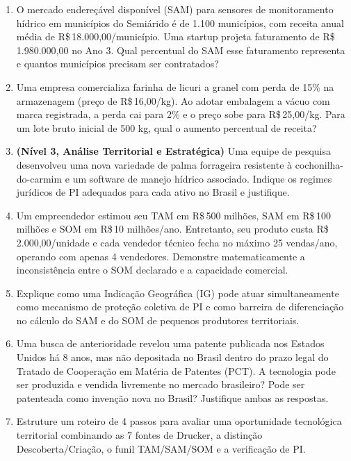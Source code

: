 \begin{enumerate}[leftmargin=1.5em, itemsep=6pt]
  \item O mercado endereçável disponível (SAM) para sensores de monitoramento hídrico em municípios do Semiárido é de 1.100 municípios, com receita anual média de R\$\,18.000,00/município. Uma startup projeta faturamento de R\$\,1.980.000,00 no Ano 3. Qual percentual do SAM esse faturamento representa e quantos municípios precisam ser contratados?
  \espacoResolucao[2.2cm]

  \item Uma empresa comercializa farinha de licuri a granel com perda de 15\% na armazenagem (preço de R\$\,16,00/kg). Ao adotar embalagem a vácuo com marca registrada, a perda cai para 2\% e o preço sobe para R\$\,25,00/kg. Para um lote bruto inicial de 500 kg, qual o aumento percentual de receita?
  \espacoResolucao[2.3cm]

  \item \textbf{(Nível 3, Análise Territorial e Estratégica)} Uma equipe de pesquisa desenvolveu uma nova variedade de palma forrageira resistente à cochonilha-do-carmim e um software de manejo hídrico associado. Indique os regimes jurídicos de PI adequados para cada ativo no Brasil e justifique.
  \espacoResolucao[2.2cm]

  \item Um empreendedor estimou seu TAM em R\$\,500 milhões, SAM em R\$\,100 milhões e SOM em R\$\,10 milhões/ano. Entretanto, seu produto custa R\$\,2.000,00/unidade e cada vendedor técnico fecha no máximo 25 vendas/ano, operando com apenas 4 vendedores. Demonstre matematicamente a inconsistência entre o SOM declarado e a capacidade comercial.
  \espacoResolucao[2.4cm]

  \item Explique como uma Indicação Geográfica (IG) pode atuar simultaneamente como mecanismo de proteção coletiva de PI e como barreira de diferenciação no cálculo do SAM e do SOM de pequenos produtores territoriais.
  \espacoResolucao[2.2cm]

  \item Uma busca de anterioridade revelou uma patente publicada nos Estados Unidos há 8 anos, mas não depositada no Brasil dentro do prazo legal do Tratado de Cooperação em Matéria de Patentes (PCT). A tecnologia pode ser produzida e vendida livremente no mercado brasileiro? Pode ser patenteada como invenção nova no Brasil? Justifique ambas as respostas.
  \espacoResolucao[2.4cm]

  \item Estruture um roteiro de 4 passos para avaliar uma oportunidade tecnológica territorial combinando as 7 fontes de Drucker, a distinção Descoberta/Criação, o funil TAM/SAM/SOM e a verificação de PI.
  \espacoResolucao[2.4cm]
\end{enumerate}


